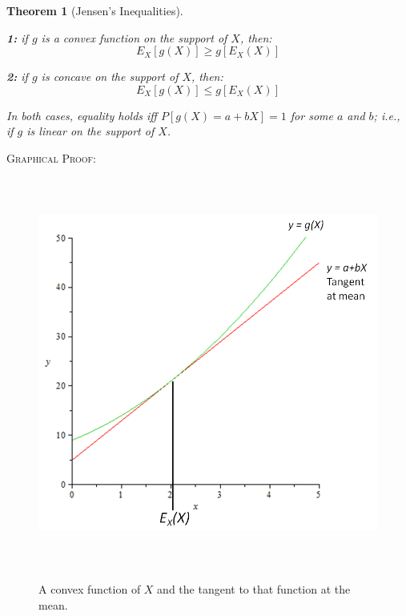 \documentclass[12pt,a4paper]{article}
\newtheorem{thm}{Theorem}[subsection]
\begin{document}
\begin{thm}[Jensen's Inequalities]$\;$\par\vspace{1cm}

{\bf 1: } if $g$ is a convex function on the support of $X$, then:
$$E_X[g(X)] \geq g[E_X(X)]$$\par\vspace{1cm}

{\bf 2: } if $g$ is concave on the support of $X$, then:
$$E_X[g(X)] \leq g[E_X(X)]$$\par\vspace{1cm}

In both cases, equality holds iff $P[g(X) = a+bX] = 1$ for some $a$ and $b$; i.e., if $g$ is linear on the support of $X$.

\end{thm}

\noindent\textsc{Graphical Proof:}\par\vspace{1cm}

\begin{figure}[h]
\begin{center}
\includegraphics[height=12.86cm,width=13.8cm]{M2S1 Jensen's Inequalities.png}\label{jensen}
\caption{A convex function of $X$ and the tangent to that function at the mean.}
\end{center}
\end{figure}
\end{document}
